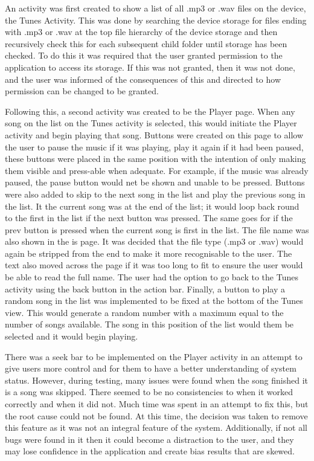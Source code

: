 \documentclass{l4proj}
\begin{document}
An activity was first created to show a list of all .mp3 or .wav files on the device, the Tunes Activity. This was done by searching the device storage for files ending with .mp3 or .wav at the top file hierarchy of the device storage and then recursively check this for each subsequent child folder until storage has been checked. To do this it was required that the user granted permission to the application to access its storage. If this was not granted, then it was not done, and the user was informed of the consequences of this and directed to how permission can be changed to be granted.

Following this, a second activity was created to be the Player page. When any song on the list on the Tunes activity is selected, this would initiate the Player activity and begin playing that song. Buttons were created on this page to allow the user to pause the music if it was playing, play it again if it had been paused, these buttons were placed in the same position with the intention of only making them visible and press-able when adequate. For example, if the music was already paused, the pause button would net be shown and unable to be pressed. Buttons were also added to skip to the next song in the list and play the previous song in the list. It the current song was at the end of the list; it would loop back round to the first in the list if the next button was pressed. The same goes for if the prev button is pressed when the current song is first in the list. The file name was also shown in the is page. It was decided that the file type (.mp3 or .wav) would again be stripped from the end to make it more recognisable to the user. The text also moved across the page if it was too long to fit to ensure the user would be able to read the full name. The user had the option to go back to the Tunes activity using the back button in the action bar. Finally, a button to play a random song in the list was implemented to be fixed at the bottom of the Tunes view. This would generate a random number with a maximum equal to the number of songs available. The song in this position of the list would them be selected and it would begin playing.

There was a seek bar to be implemented on the Player activity in an attempt to give users more control and for them to have a better understanding of system status. However, during testing, many issues were found when the song finished it is a song was skipped. There seemed to be no consistencies to when it worked correctly and when it did not. Much time was spent in an attempt to fix this, but the root cause could not be found. At this time, the decision was taken to remove this feature as it was not an integral feature of the system. Additionally, if not all bugs were found in it then it could become a distraction to the user, and they may lose confidence in the application and create bias results that are skewed.
\end{document}
